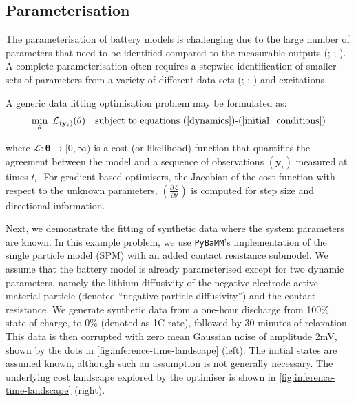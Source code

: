 \documentclass[
]{article}
\begin{document}
\subsection{Parameterisation}\label{parameterisation}

The parameterisation of battery models is challenging due to the large
number of parameters that need to be identified compared to the
measurable outputs (; ;
). A complete
parameterisation often requires a stepwise identification of smaller
sets of parameters from a variety of different data sets
(;
; ) and excitations.

A generic data fitting optimisation problem may be formulated as:
\begin{equation}
\min_{\mathbf{\theta}} ~ \mathcal{L}_{(\mathbf{y}_i)}(\mathbf{\theta}) ~~~
\textrm{subject to equations (\ref{dynamics})\textrm{-}(\ref{initial_conditions})}
\label{eqn:parameterisation}
\end{equation}

where \(\mathcal{L} : \mathbf{\theta} \mapsto [0,\infty)\) is a cost (or
likelihood) function that quantifies the agreement between the model and
a sequence of observations \((\mathbf{y}_i)\) measured at times \(t_i\).
For gradient-based optimisers, the Jacobian of the cost function with
respect to the unknown parameters,
\((\frac{\partial \mathcal{L}}{\partial \theta})\) is computed for step
size and directional information.

Next, we demonstrate the fitting of synthetic data where the system
parameters are known. In this example problem, we use \texttt{PyBaMM}'s
implementation of the single particle model (SPM) with an added contact
resistance submodel. We assume that the battery model is already
parameterised except for two dynamic parameters, namely the lithium
diffusivity of the negative electrode active material particle (denoted
``negative particle diffusivity'') and the contact resistance. We
generate synthetic data from a one-hour discharge from 100\% state of
charge, to 0\% (denoted as 1C rate), followed by 30 minutes of
relaxation. This data is then corrupted with zero mean Gaussian noise of
amplitude 2mV, shown by the dots in
\autoref{fig:inference-time-landscape} (left). The initial states are
assumed known, although such an assumption is not generally necessary.
The underlying cost landscape explored by the optimiser is shown in
\autoref{fig:inference-time-landscape} (right).
\end{document}
